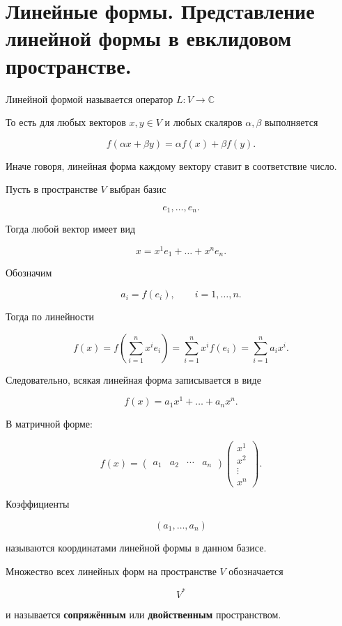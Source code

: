 \documentclass[14pt]{extreport}
\begin{document}
    \chapter{Линейные формы. Представление линейной формы в евклидовом пространстве.}

    \begin{defbox}
        Линейной формой называется оператор $L: V \rightarrow \mathbb{C}$
    \end{defbox}

    То есть для любых векторов \(x,y\in V\) и любых скаляров
    \(\alpha,\beta\) выполняется

    \[
    f(\alpha x+\beta y)
    =
    \alpha f(x)+\beta f(y).
    \]

    Иначе говоря, линейная форма каждому вектору ставит в соответствие число.
    
    Пусть в пространстве \(V\) выбран базис

\[
e_1,\ldots,e_n.
\]

Тогда любой вектор имеет вид

\[
x=x^1e_1+\ldots+x^ne_n.
\]

Обозначим

\[
a_i=f(e_i),
\qquad i=1,\ldots,n.
\]

Тогда по линейности

\[
f(x)
=
f\!\left(\sum_{i=1}^{n}x^ie_i\right)
=
\sum_{i=1}^{n}x^if(e_i)
=
\sum_{i=1}^{n}a_ix^i.
\]

Следовательно, всякая линейная форма записывается в виде

\[
f(x)=a_1x^1+\ldots+a_nx^n.
\]

В матричной форме:

\[
f(x)=
\begin{pmatrix}
a_1 & a_2 & \cdots & a_n
\end{pmatrix}
\begin{pmatrix}
x^1\\
x^2\\
\vdots\\
x^n
\end{pmatrix}.
\]

Коэффициенты

\[
(a_1,\ldots,a_n)
\]

называются координатами линейной формы в данном базисе.

\begin{defbox}
    Множество всех линейных форм на пространстве \(V\) обозначается

\[
V^*
\]

и называется \textbf{сопряжённым} или \textbf{двойственным}
пространством.
\end{defbox}
\end{document}

